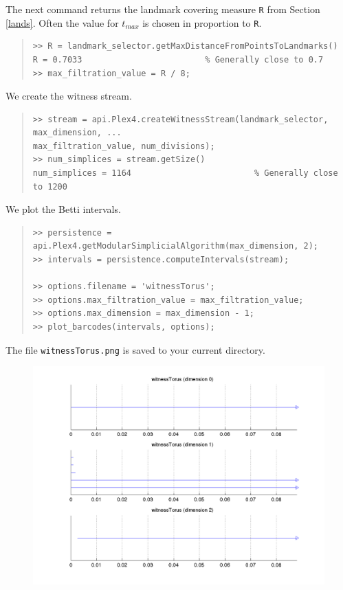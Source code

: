 \documentclass[amscd, amssymb, verbatim]{amsart}[12pt]
\theoremstyle{remark}
\theoremstyle{remark}
\theoremstyle{remark}
\begin{document}
The next command returns the landmark covering measure \texttt{R} from Section \ref{lands}.  Often the value for $t_{max}$ is chosen in proportion to \texttt{R}.

\begin{quote} \begin{verbatim}
>> R = landmark_selector.getMaxDistanceFromPointsToLandmarks()
R = 0.7033                         % Generally close to 0.7
>> max_filtration_value = R / 8; 
\end{verbatim} \end{quote}

We create the witness stream.

\begin{quote} \begin{verbatim}
>> stream = api.Plex4.createWitnessStream(landmark_selector, max_dimension, ...
max_filtration_value, num_divisions); 
>> num_simplices = stream.getSize()
num_simplices = 1164                         % Generally close to 1200
\end{verbatim} \end{quote}

We plot the Betti intervals.

\begin{quote} \begin{verbatim}
>> persistence = api.Plex4.getModularSimplicialAlgorithm(max_dimension, 2);
>> intervals = persistence.computeIntervals(stream);

>> options.filename = 'witnessTorus';
>> options.max_filtration_value = max_filtration_value;
>> options.max_dimension = max_dimension - 1;
>> plot_barcodes(intervals, options);
\end{verbatim} \end{quote}

The file \texttt{witnessTorus.png} is saved to your current directory.

\begin{figure}[htp]
	\begin{center}
    	\includegraphics[width=6in]{witnessTorus.png}
   	\end{center}
\end{figure}
\FloatBarrier
\end{document}
